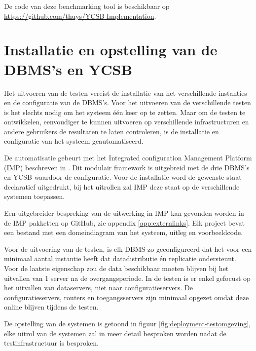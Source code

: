 De code van deze benchmarking tool is beschikbaar op \url{https://github.com/thuys/YCSB-Implementation}. 

\section{Installatie en opstelling van de DBMS's en YCSB}
Het uitvoeren van de testen vereist de installatie van het verschillende instanties en de configuratie van de DBMS's. Voor het uitvoeren van de verschillende testen is het slechts nodig om het systeem één keer op te zetten. Maar om de testen te ontwikkelen, eenvoudiger te kunnen uitvoeren op verschillende infrastructuren en andere gebruikers de resultaten te laten controleren, is de installatie en configuratie van het systeem geautomatiseerd. 

De automatisatie gebeurt met het Integrated configuration Management Platform (IMP) beschreven in \cite{KULeuven-453199}. Dit modulair framework is uitgebreid met de drie DBMS's en YCSB waardoor de configuratie. Voor de installatie word de gewenste staat declaratief uitgedrukt, bij het uitrollen zal IMP deze staat op de verschillende systemen toepassen. 

Een uitgebreider bespreking van de uitwerking in IMP kan gevonden worden in de IMP pakketten op GitHub, zie appendix \ref{app:externlinks}. Elk project bevat een bestand met een domeindiagram van het systeem, uitleg en voorbeeldcode. 

Voor de uitvoering van de testen, is elk DBMS zo geconfigureerd dat het voor een minimaal aantal instantie heeft dat datadistributie én replicatie ondersteunt. Voor de laatste eigenschap zou de data beschikbaar moeten blijven bij het uitvallen van 1 server na de overgangsperiode. In de testen is er enkel gefocust op het uitvallen van dataservers, niet naar configuratieservers. De configuratieservers, routers en toegangsservers zijn minimaal opgezet omdat deze online blijven tijdens de testen.  

De opstelling van de systemen is getoond in figuur \ref{fig:deployment-testomgeving}, elke uitrol van de systemen zal in meer detail besproken worden nadat de testinfrastructuur is besproken.  

